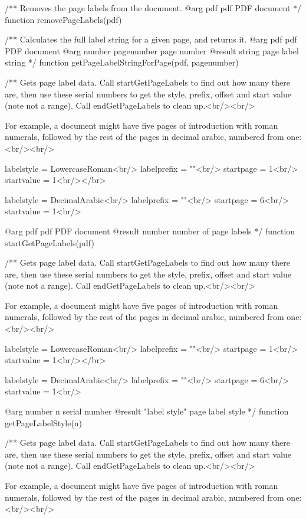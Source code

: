 /** Removes the page labels from the document.
@arg {pdf} pdf PDF document */
function removePageLabels(pdf) {}

/** Calculates the full label string for a given page, and returns it.
@arg {pdf} pdf PDF document
@arg {number} pagenumber page number
@result {string} page label string */
function getPageLabelStringForPage(pdf, pagenumber) {}

/** Gets page label data. Call startGetPageLabels to find out how many
there are, then use these serial numbers to get the style, prefix, offset
and start value (note not a range). Call endGetPageLabels to clean up.<br/><br/>

For example, a document might have five pages of introduction with roman
numerals, followed by the rest of the pages in decimal arabic, numbered from
one:<br/><br/>

labelstyle = LowercaseRoman<br/>
labelprefix = ""<br/>
startpage = 1<br/>
startvalue = 1<br/></br>

labelstyle = DecimalArabic<br/>
labelprefix = ""<br/>
startpage = 6<br/>
startvalue = 1<br/>

@arg {pdf} pdf PDF document
@result {number} number of page labels */
function startGetPageLabels(pdf) {}

/** Gets page label data. Call startGetPageLabels to find out how many
there are, then use these serial numbers to get the style, prefix, offset
and start value (note not a range). Call endGetPageLabels to clean up.<br/><br/>

For example, a document might have five pages of introduction with roman
numerals, followed by the rest of the pages in decimal arabic, numbered from
one:<br/><br/>

labelstyle = LowercaseRoman<br/>
labelprefix = ""<br/>
startpage = 1<br/>
startvalue = 1<br/></br>

labelstyle = DecimalArabic<br/>
labelprefix = ""<br/>
startpage = 6<br/>
startvalue = 1<br/>

@arg {number} n serial number
@result {"label style"} page label style */
function getPageLabelStyle(n) {}

/** Gets page label data. Call startGetPageLabels to find out how many
there are, then use these serial numbers to get the style, prefix, offset
and start value (note not a range). Call endGetPageLabels to clean up.<br/><br/>

For example, a document might have five pages of introduction with roman
numerals, followed by the rest of the pages in decimal arabic, numbered from
one:<br/><br/>

